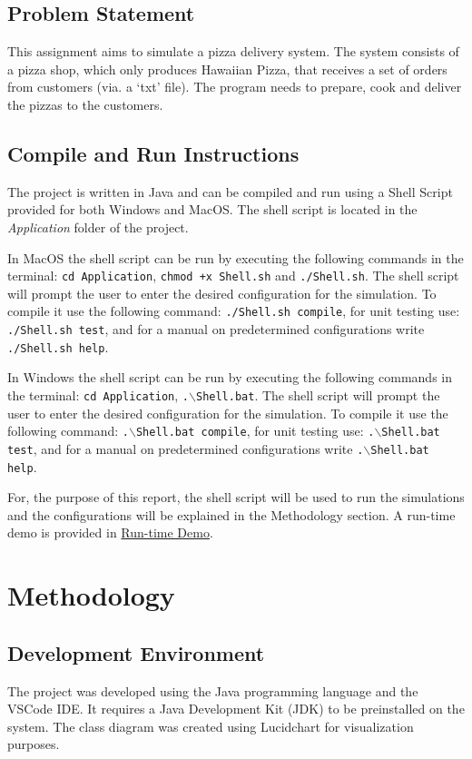 \documentclass[conference]{IEEEtran}
\begin{document}
\subsection{Problem Statement}
This assignment aims to simulate a pizza delivery system. The system consists of a pizza shop, which only produces Hawaiian Pizza, that receives a set of orders from customers (via. a `txt' file). The program needs to prepare, cook and deliver the pizzas to the customers. 

\subsection{Compile and Run Instructions}
The project is written in Java and can be compiled and run using a Shell Script provided for both Windows and MacOS. The shell script is located in the \textit{Application} folder of the project. 

In MacOS the shell script can be run by executing the following commands in the terminal: \texttt{cd Application}, \texttt{chmod +x Shell.sh} and \texttt{./Shell.sh}. The shell script will prompt the user to enter the desired configuration for the simulation. To compile it use the following command: \texttt{./Shell.sh compile}, for unit testing use: \texttt{./Shell.sh test}, and for a manual on predetermined configurations write \texttt{./Shell.sh help}.

In Windows the shell script can be run by executing the following commands in the terminal: \texttt{cd Application}, \texttt{.$\backslash$Shell.bat}. The shell script will prompt the user to enter the desired configuration for the simulation. To compile it use the following command: \texttt{.$\backslash$Shell.bat compile}, for unit testing use: \texttt{.$\backslash$Shell.bat test}, and for a manual on predetermined configurations write \texttt{.$\backslash$Shell.bat help}.

For, the purpose of this report, the shell script will be used to run the simulations and the configurations will be explained in the Methodology section. A run-time demo is provided in \href{https://www.youtube.com/watch?v=QjEa1RC2i9c}{Run-time Demo}.

\section{Methodology}
\subsection{Development Environment}
The project was developed using the Java programming language and the VSCode IDE. It requires a Java Development Kit (JDK) to be preinstalled on the system. The class diagram was created using Lucidchart for visualization purposes.
\end{document}
